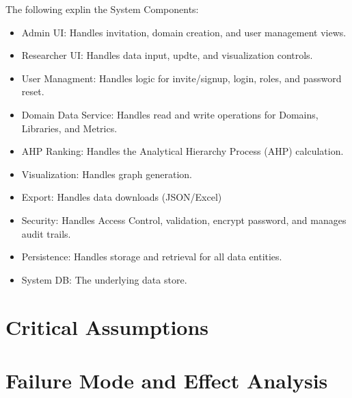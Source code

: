 \documentclass{article}
\begin{document}
The following explin the System Components:
\begin{itemize}
    \item Admin UI: Handles invitation, domain creation, and user management views.
    \item Researcher UI: Handles data input, updte, and visualization controls.
    \item User Managment: Handles logic for invite/signup, login, roles, and password reset.
    \item Domain Data Service: Handles read and write operations for Domains, Libraries, and Metrics.
    \item AHP Ranking: Handles the Analytical Hierarchy Process (AHP) calculation.
    \item Visualization: Handles graph generation.
    \item Export: Handles data downloads (JSON/Excel)
    \item Security: Handles Access Control, validation, encrypt password, and manages audit trails.
    \item Persistence: Handles storage and retrieval for all data entities.
    \item System DB: The underlying data store.
\end{itemize}



\section{Critical Assumptions}


\section{Failure Mode and Effect Analysis}

\end{document}
